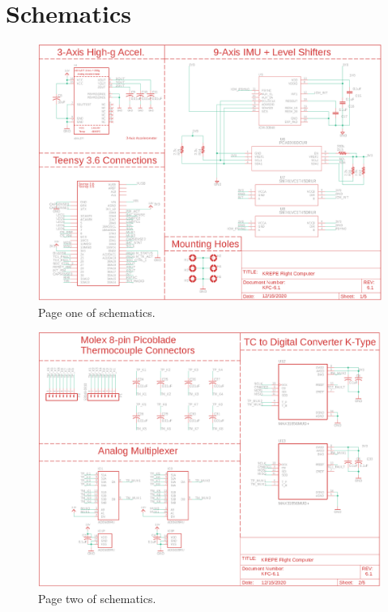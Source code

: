 \documentclass{article}
\begin{document}
\section{Schematics}
\label{appa}

\begin{figure}[H]
    \centering
    \includegraphics[width=\textwidth]{images/page1.png}
    \caption{Page one of schematics.}
    \label{fig:page1-2}
\end{figure}

\begin{figure}[H]
    \centering
    \includegraphics[width=\textwidth]{images/page2.png}
    \caption{Page two of schematics.}
    \label{fig:page1_1}
\end{figure}
\end{document}

